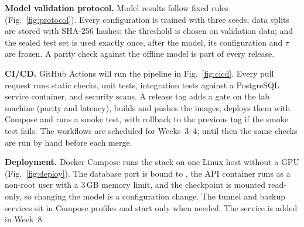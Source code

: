 \textbf{Model validation protocol.} Model results follow fixed rules (Fig.~\ref{fig:protocol}). Every
configuration is trained with three seeds; data splits are stored with SHA-256 hashes; the threshold
is chosen on validation data; and the sealed test set is used exactly once, after the model, its
configuration and $\tau$ are frozen. A parity check against the offline model is part of every
release.


\textbf{CI/CD.} GitHub Actions will run the pipeline in Fig.~\ref{fig:cicd}.
Every pull request runs static checks, unit tests, integration tests against a PostgreSQL service
container, and security scans. A release tag adds a gate on the lab machine (parity and latency),
builds and pushes the images, deploys them with Compose and runs a smoke test, with rollback to the
previous tag if the smoke test fails. The workflows are scheduled for Weeks~3--4; until then the same
checks are run by hand before each merge.


\textbf{Deployment.} Docker Compose runs the stack on one Linux host without a GPU
(Fig.~\ref{fig:deploy}). The database port is bound to , the API container runs as a
non-root user with a 3\,GB memory limit, and the checkpoint is mounted read-only, so changing the
model is a configuration change. The tunnel and backup services sit in Compose profiles and start only
when needed. The  service is added in Week~8.

